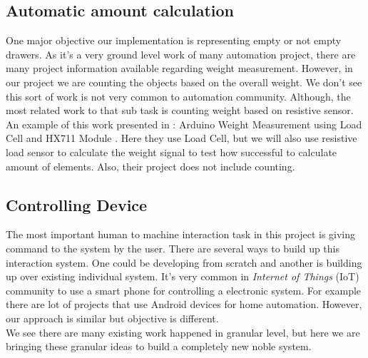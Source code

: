 \subsection{Automatic amount calculation}
One major objective our implementation is representing empty or not empty drawers. 
As it's a very ground level work of many automation project, there are many project information available regarding weight measurement. 
However, in our project we are counting the objects based on the overall weight. 
We don't see this sort of work is not very common to automation community.
Although, the most related work to that sub task is counting weight based on resistive sensor.
An example of this work presented in \cite{RefWorks:weight_sensor}: Arduino Weight Measurement using Load Cell and HX711 Module \cite{RefWorks:hx711module}. 
Here they use Load Cell, but we will also use resistive load sensor to calculate the weight signal to test how successful to calculate amount of elements.
Also, their project does not include counting.

\subsection{Controlling Device}
The most important human to machine interaction task in this project is giving command to the system by the user. 
There are several ways to build up this interaction system. 
One could be developing from scratch and another is building up over existing individual system.
It's very common in \textit{Internet of Things} (IoT) community to use a smart phone for controlling a electronic system.
For example there are lot of projects that use Android devices for home automation. 
However, our approach is similar but objective is different.
\\
We see there are many existing work happened in granular level, but here we are bringing these granular ideas to build a completely new noble system.
